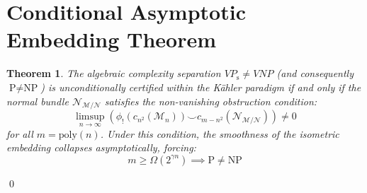 \documentclass{article}
\newtheorem{theorem}{Theorem}
\begin{document}
\section{Conditional Asymptotic Embedding Theorem}
\begin{theorem}
The algebraic complexity separation $VP_{\text{s}} \neq VNP$ (and consequently $\text{P} \neq \text{NP}$) is unconditionally certified within the K\"ahler paradigm if and only if the normal bundle $\mathcal{N}_{\mathcal{M}/\mathcal{N}}$ satisfies the non-vanishing obstruction condition:
\begin{equation}
\limsup_{n \to \infty} \left( \phi_!(c_{n^2}(\mathcal{M}_n)) \smallsmile c_{m-n^2}(\mathcal{N}_{\mathcal{M}/\mathcal{N}}) \right) \neq 0
\end{equation}
for all $m = \text{poly}(n)$. Under this condition, the smoothness of the isometric embedding collapses asymptotically, forcing:
\begin{equation}
m \geq \Omega(2^{\gamma n}) \implies \text{P} \neq \text{NP}
\end{equation}
\end{theorem}
\qed
\end{document}
